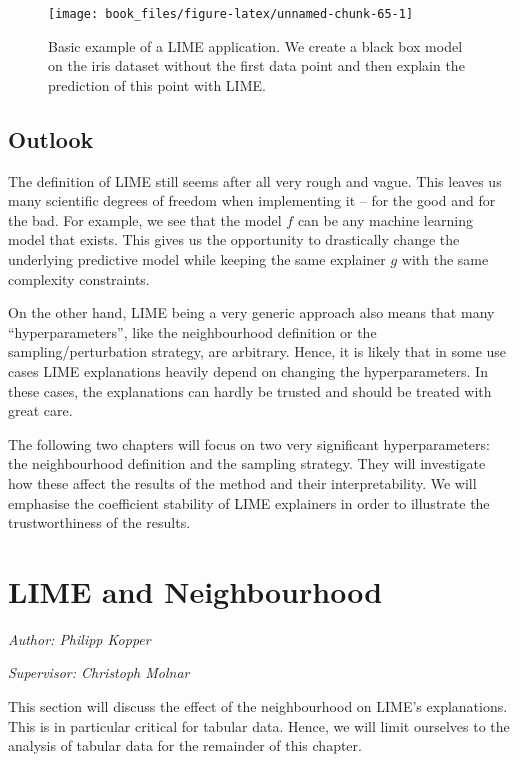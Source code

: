 \documentclass[]{krantz}
\begin{document}
\begin{figure}

{\centering \texttt{[image: book\_files/figure-latex/unnamed-chunk-65-1]} 

}

\caption{Basic example of a LIME application. We create a black box model on the iris dataset without the first data point and then explain the prediction of this point with LIME.}\label{fig:unnamed-chunk-65}
\end{figure}

\section{Outlook}\label{outlook-1}

The definition of LIME still seems after all very rough and vague. This
leaves us many scientific degrees of freedom when implementing it -- for
the good and for the bad. For example, we see that the model \(f\) can
be any machine learning model that exists. This gives us the opportunity
to drastically change the underlying predictive model while keeping the
same explainer \(g\) with the same complexity constraints.

On the other hand, LIME being a very generic approach also means that
many ``hyperparameters'', like the neighbourhood definition or the
sampling/perturbation strategy, are arbitrary. Hence, it is likely that
in some use cases LIME explanations heavily depend on changing the
hyperparameters. In these cases, the explanations can hardly be trusted
and should be treated with great care.

The following two chapters will focus on two very significant
hyperparameters: the neighbourhood definition and the sampling strategy.
They will investigate how these affect the results of the method and
their interpretability. We will emphasise the coefficient stability of
LIME explainers in order to illustrate the trustworthiness of the
results.

\chapter{LIME and Neighbourhood}\label{lime-neighbor}

\emph{Author: Philipp Kopper}

\emph{Supervisor: Christoph Molnar}

This section will discuss the effect of the neighbourhood on LIME's
explanations. This is in particular critical for tabular data. Hence, we
will limit ourselves to the analysis of tabular data for the remainder
of this chapter.
\end{document}
